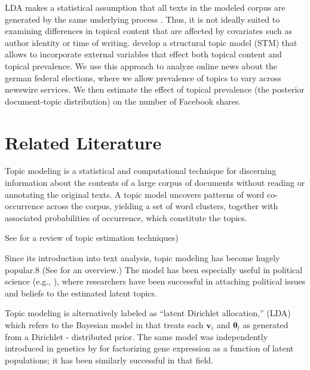 \documentclass[12pt,a4paper,notitlepage]{article}
\begin{document}
LDA makes a statistical assumption that all texts in the modeled corpus are generated by the same underlying process \citep{blei_latent_2003}. Thus, it is not ideally suited to examining differences in topical content that are affected by covariates such as author identity or time of writing. \citet{roberts_model_2016} develop a structural topic model (STM) that allows to incorporate external variables that effect both topical content and topical prevalence. We use this approach to analyze online news about the german federal elections, where we allow prevalence of topics to vary across newswire services. We then estimate the effect of topical prevalence (the posterior document-topic distribution) on the number of Facebook shares. 


\section{Related Literature}




Topic modeling is a statistical and computational technique for discerning information about the contents of a large corpus of documents without reading or annotating the original texts. A topic model uncovers patterns of word co-occurrence across the corpus, yielding a set of word clusters, together with associated probabilities of occurrence, which constitute the topics.

See \citep{taddy_estimation_2012} for a review of topic estimation techniques)

Since its introduction into text analysis, topic modeling has become hugely popular.8 (See \citet{blei_probabilistic_2012} for an overview.) The model has been especially useful in political science (e.g., \citep{grimmer_bayesian_2010}), where researchers have been successful in attaching political issues and beliefs to the estimated latent topics.

Topic modeling is alternatively labeled as “latent Dirichlet allocation,” (LDA) which refers to the Bayesian model in \citet{blei_latent_2003} that treats each $\boldsymbol{v}_i$ and $\boldsymbol{\theta}_l$ as generated from a Dirichlet - distributed prior.
The same model was independently introduced in genetics by \citet{pritchard_inference_2000} for factorizing gene expression as a function of latent populations; it has been similarly successful in that field. 
\end{document}
